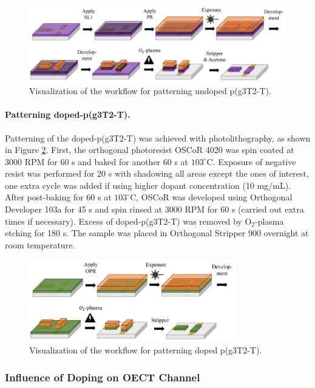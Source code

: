 \begin{figure}[ht]
	\centering
	\includegraphics[width=12cm]{Images/pdf/undoped-patterning.pdf}
	\caption{Visualization of the workflow for patterning undoped p(g3T2-T).}
	\label{fig:undopedpat}
\end{figure}

\paragraph{Patterning doped-p(g3T2-T).}Patterning of the doped-p(g3T2-T) was achieved with photolithography, as shown in Figure \ref{fig:dopedpat}. First, the orthogonal photoresist OSCoR 4020 was spin coated at 3000 RPM for 60 s and baked for another 60 s at $103^{\circ}$C. Exposure of negative resist was performed for 20 s with shadowing all areas except the ones of interest, one extra cycle was added if using higher dopant concentration (10 mg/mL). After post-baking for 60 s at $103^{\circ}$C, OSCoR was developed using Orthogonal Developer 103a for 45 s and spin rinsed at 3000 RPM for 60 s (carried out extra times if necessary). Excess of doped-p(g3T2-T) was removed by O$_{2}$-plasma etching for 180 s. The sample was placed in Orthogonal Stripper 900 overnight at room temperature.

\begin{figure}[ht]
	\centering
	\includegraphics[width=9cm]{Images/pdf/doped-patterning.pdf}
	\caption{Visualization of the workflow for patterning doped p(g3T2-T).}
	\label{fig:dopedpat}
\end{figure}

\subsubsection{Influence of Doping on OECT Channel} \label{subsec:channel}

